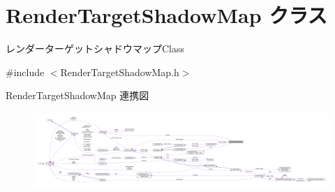 \hypertarget{class_render_target_shadow_map}{}\section{Render\+Target\+Shadow\+Map クラス}
\label{class_render_target_shadow_map}


レンダーターゲットシャドウマップ\+Class  




{\ttfamily \#include $<$Render\+Target\+Shadow\+Map.\+h$>$}



Render\+Target\+Shadow\+Map 連携図\nopagebreak
\begin{figure}[H]
\begin{center}
\leavevmode
\includegraphics[width=350pt]{class_render_target_shadow_map__coll__graph}
\end{center}
\end{figure}
